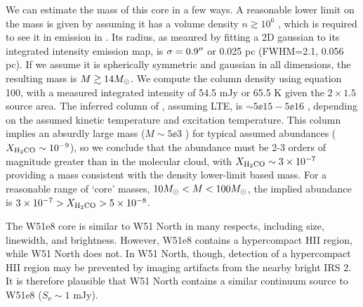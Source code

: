 We can estimate the mass of this core in a few ways.  A reasonable lower limit
on the mass is given by assuming it has a volume density $n\gtrsim10^6$ \percc,
which is required to see it in emission in \ortho \twotwo.  Its radius, as
meaured by fitting a 2D gaussian to its integrated intensity emission map, is
$\sigma=0.9\mbox{$^{\prime\prime}$}$ or 0.025 pc (FWHM=2.1\arcsec, 0.056 pc).  If we assume it
is spherically symmetric and gaussian in
all dimensions, the resulting mass is $M\gtrsim14M_{\odot}$.
We compute the \ortho \twotwo column density using \citet{Mangum2015a} equation
100, with a measured integrated intensity of 54.5 mJy \kms or 65.5 K \kms given
the $2\times1.5$\arcsec source area.  The inferred column of \ortho,
assuming LTE, is $\sim5\ee{15} - 5\ee{16}$ \persc, depending on the assumed
kinetic temperature and excitation temperature.  This \formaldehyde column
implies an absurdly large mass ($M\sim5\ee{3}$ \msun) for typical assumed abundances
($X_{\textrm{H}_2\textrm{CO}}\sim10^{-9}$), so we conclude that the \formaldehyde abundance
must be 2-3 orders of magnitude greater than in the molecular cloud, with
$X_{\textrm{H}_2\textrm{CO}}\sim3\times10^{-7}$ providing a mass consistent with the density
lower-limit based mass.  For a reasonable range of `core' masses, $10
M_{\odot}<M<100 M_{\odot}$, the implied abundance is $3\times10^{-7} > X_{\textrm{H}_2\textrm{CO}} >
5\times10^{-8}$.

The W51e8 core is similar to W51 North in many respects, including size,
linewidth, and brightness.  However, W51e8 contains a hypercompact HII region,
while W51 North does not.  In W51 North, though, detection of a hypercompact
HII region may be prevented by imaging artifacts from the nearby bright IRS 2.
It is therefore plausible that W51 North contains a similar continuum source to
W51e8 ($S_\nu \sim 1$ mJy).


